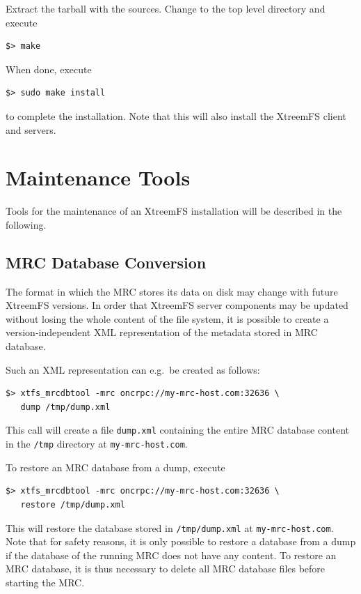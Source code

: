 \documentclass[a4paper,10pt]{book}
\begin{document}
Extract the tarball with the sources. Change to the top level directory and execute

\begin{verbatim}
$> make
\end{verbatim}

When done, execute

\begin{verbatim}
$> sudo make install
\end{verbatim}

to complete the installation. Note that this will also install the XtreemFS client and servers.

\section{Maintenance Tools}

Tools for the maintenance of an XtreemFS installation will be described in the following.

\subsection{MRC Database Conversion}

The format in which the MRC stores its data on disk may change with future XtreemFS versions. In order that XtreemFS server components may be updated without losing the whole content of the file system, it is possible to create a version-independent XML representation of the metadata stored in MRC database.

Such an XML representation can e.g.\ be created as follows:

\begin{verbatim}
$> xtfs_mrcdbtool -mrc oncrpc://my-mrc-host.com:32636 \
   dump /tmp/dump.xml
\end{verbatim}

This call will create a file \texttt{dump.xml} containing the entire MRC database content in the \texttt{/tmp} directory at \texttt{my-mrc-host.com}.

To restore an MRC database from a dump, execute

\begin{verbatim}
$> xtfs_mrcdbtool -mrc oncrpc://my-mrc-host.com:32636 \
   restore /tmp/dump.xml
\end{verbatim}

This will restore the database stored in \texttt{/tmp/dump.xml} at \texttt{my-mrc-host.com}. Note that for safety reasons, it is only possible to restore a database from a dump if the database of the running MRC does not have any content. To restore an MRC database, it is thus necessary to delete all MRC database files before starting the MRC.
\end{document}
